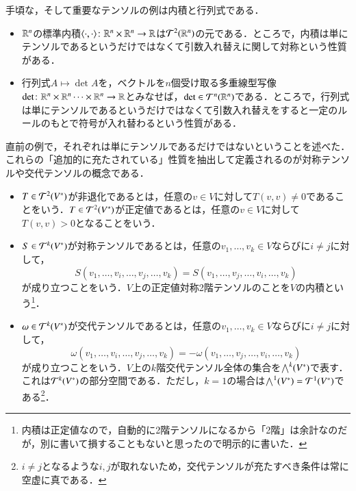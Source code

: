 \begin{exm}手頃な，そして重要なテンソルの例は内積と行列式である．
\begin{itemize}
\item $\mathbb{R}^n$の標準内積$\langle \cdot, \cdot \rangle \colon \mathbb{R}^n \times \mathbb{R}^n \to \mathbb{R}$は$\mathcal{T}^2(\mathbb{R}^n)$の元である．ところで，内積は単にテンソルであるというだけではなくて引数入れ替えに関して対称という性質がある．
\item 行列式$A \mapsto \det A$を，ベクトルを$n$個受け取る多重線型写像$\det \colon \mathbb{R}^n \times \mathbb{R}^n \dots \times \mathbb{R}^n \to \mathbb{R}$とみなせば，$\det \in \mathcal{T}^n(\mathbb{R}^n)$である．ところで，行列式は単にテンソルであるというだけではなくて引数入れ替えをすると一定のルールのもとで符号が入れ替わるという性質がある．
\end{itemize}
\end{exm}

直前の例で，それぞれは単にテンソルであるだけではないということを述べた．これらの「追加的に充たされている」性質を抽出して定義されるのが対称テンソルや交代テンソルの概念である．

\begin{defi}
\leavevmode
\begin{itemize}
\item $T \in \mathcal{T}^2(V^*)$が非退化であるとは，任意の$v \in V$に対して$T(v,v) \neq 0$であることをいう．$T \in \mathcal{T}^2(V^*)$が正定値であるとは，任意の$v \in V$に対して$T(v,v) > 0$となることをいう．
\item $S \in \mathcal{T}^k(V^*)$が対称テンソルであるとは，任意の$v_1, \dots, v_k \in V$ならびに$i \neq j$に対して，
\begin{equation}
S(v_1,\dots, v_i, \dots, v_j, \dots, v_k) = S(v_1, \dots, v_j, \dots, v_i, \dots, v_k)
\end{equation}
が成り立つことをいう．$V$上の正定値対称2階テンソルのことを$V$の内積という\footnote{内積は正定値なので，自動的に2階テンソルになるから「2階」は余計なのだが，別に書いて損することもないと思ったので明示的に書いた．}．
\item $\omega \in \mathcal{T}^k(V^*)$が交代テンソルであるとは，任意の$v_1, \dots, v_k \in V$ならびに$i \neq j$に対して，
\begin{equation}
\omega(v_1,\dots, v_i, \dots, v_j, \dots, v_k) = -\omega(v_1, \dots, v_j, \dots, v_i, \dots, v_k)
\end{equation}
が成り立つことをいう．$V$上の$k$階交代テンソル全体の集合を$\bigwedge^k(V^*)$で表す．これは$\mathcal{T}^k(V^*)$の部分空間である．ただし，$k=1$の場合は$\bigwedge^1(V^*) = \mathcal{T}^1(V^*)$である\footnote{$i \neq j$となるような$i,j$が取れないため，交代テンソルが充たすべき条件は常に空虚に真である．}．
\end{itemize}
\end{defi}

